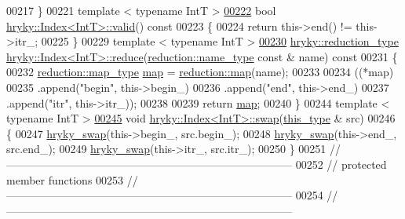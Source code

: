 \begin{DoxyCode}
00217 \}
00221 \textcolor{keyword}{template} < \textcolor{keyword}{typename} IntT >
\hypertarget{index_8h_source_l00222}{}\hyperlink{classhryky_1_1_index_a81c0296f0896b3b6a012c948befd81dc}{00222} \textcolor{keywordtype}{bool} \hyperlink{classhryky_1_1_index}{hryky::Index<IntT>::valid}()\textcolor{keyword}{ const}
00223 \textcolor{keyword}{}\{
00224     \textcolor{keywordflow}{return} this->end() != this->itr\_;
00225 \}
00229 \textcolor{keyword}{template} < \textcolor{keyword}{typename} IntT >
\hypertarget{index_8h_source_l00230}{}\hyperlink{classhryky_1_1_index_a5994b0481f6f94baa69e5f4c141b86a7}{00230} \hyperlink{classhryky_1_1_intrusive_ptr}{hryky::reduction_type} \hyperlink{namespacehryky_af41cb3af6766761da0ff21b84527a52c}{hryky::Index<IntT>::reduce}(\hyperlink{classhryky_1_1reduction_1_1_string}{reduction::name_type} \textcolor{keyword}{const} & 
      name)\textcolor{keyword}{ const}
00231 \textcolor{keyword}{}\{
00232     \hyperlink{classhryky_1_1_intrusive_ptr}{reduction::map_type} \hyperlink{namespacehryky_1_1reduction_ac5eae270cf8047b294dc4ff3e5e11a79}{map} = \hyperlink{namespacehryky_1_1reduction_ac5eae270cf8047b294dc4ff3e5e11a79}{reduction::map}(name);
00233 
00234     ((*map)
00235      .append(\textcolor{stringliteral}{"begin"}, this->begin\_)
00236      .append(\textcolor{stringliteral}{"end"}, this->end\_)
00237      .append(\textcolor{stringliteral}{"itr"}, this->itr\_));
00238     
00239     \textcolor{keywordflow}{return} \hyperlink{namespacehryky_1_1reduction_ac5eae270cf8047b294dc4ff3e5e11a79}{map};
00240 \}
00244 \textcolor{keyword}{template} < \textcolor{keyword}{typename} IntT >
\hypertarget{index_8h_source_l00245}{}\hyperlink{classhryky_1_1_index_a5566075def89b43a67fc8d95ff257791}{00245} \textcolor{keywordtype}{void} \hyperlink{namespacehryky_a4282146df5ea2b68cb667896a2205909}{hryky::Index<IntT>::swap}(\hyperlink{classhryky_1_1_index}{this_type} & src)
00246 \{
00247     \hyperlink{namespacehryky_add9c1c1fdfda07cd47bcb7c16d3a823a}{hryky_swap}(this->begin\_, src.begin\_);
00248     \hyperlink{namespacehryky_add9c1c1fdfda07cd47bcb7c16d3a823a}{hryky_swap}(this->end\_, src.end\_);
00249     \hyperlink{namespacehryky_add9c1c1fdfda07cd47bcb7c16d3a823a}{hryky_swap}(this->itr\_, src.itr\_);
00250 \}
00251 \textcolor{comment}{//
      ------------------------------------------------------------------------------}
00252 \textcolor{comment}{// protected member functions}
00253 \textcolor{comment}{//
      ------------------------------------------------------------------------------}
00254 \textcolor{comment}{//
      ------------------------------------------------------------------------------}

\end{DoxyCode}

